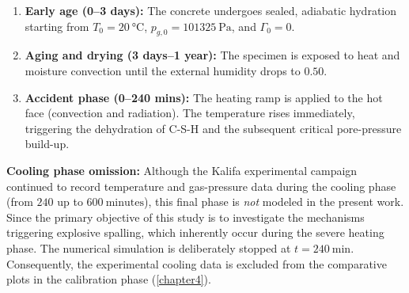 \begin{enumerate}
    \item \textbf{Early age (0--3 days):} The concrete undergoes sealed, adiabatic hydration starting from $T_0=\SI{20}{\celsius}$, $p_{g,0}=\SI{101325}{\pascal}$, and $\Gamma_0=0$.
    \item \textbf{Aging and drying (3 days--1 year):} The specimen is exposed to heat and moisture convection until the external humidity drops to $0.50$.
    \item \textbf{Accident phase (0--240 mins):} The heating ramp is applied to the hot face (convection and radiation). The temperature rises immediately, triggering the dehydration of C-S-H and the subsequent critical pore-pressure build-up.
\end{enumerate}

\textbf{Cooling phase omission:} Although the Kalifa experimental campaign continued to record temperature and gas-pressure data during the cooling phase (from $240$ up to $600~\mathrm{minutes}$), this final phase is \emph{not} modeled in the present work. Since the primary objective of this study is to investigate the mechanisms triggering explosive spalling, which inherently occur during the severe heating phase. The numerical simulation is deliberately stopped at $t=\SI{240}{\minute}$. Consequently, the experimental cooling data is excluded from the comparative plots in the calibration phase (\cref{chapter4}).